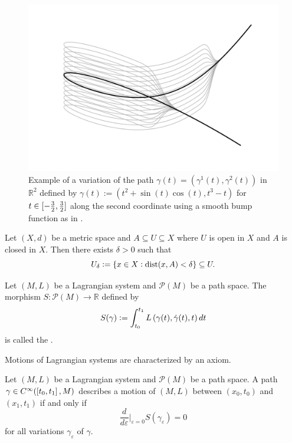 \begin{example}
	\begin{figure}[h!tb]
		\centering
		\includegraphics[width = .83\textwidth]{variation.pdf}
		\caption{Example of a variation of the path $\gamma(t) = (\gamma^1(t),\gamma^2(t))$ in $\mathbb{R}^2$ defined by $\gamma(t) := (t^2 + \sin(t)\cos(t),t^3 - t)$ for $t \in \intcc[0]{-\frac{3}{2},\frac{3}{2}}$ along the second coordinate using a smooth bump function as in \cite[42]{lee:smooth_manifolds:2013}.}
		\label{fig:variation}
	\end{figure}
\end{example}

\begin{exercise}
	\label{ex:U_delta_neighbourhood}
	Let $(X,d)$ be a metric space and $A \subseteq U \subseteq X$ where $U$ is open in $X$ and $A$ is closed in $X$. Then there exists $\delta > 0$ such that
	\begin{equation*}
		U_\delta := \cbr[0]{x \in X : \dist(x,A) < \delta} \subseteq U.
	\end{equation*}
\end{exercise}

\begin{definition}
	Let $(M,L)$ be a Lagrangian system and $\mathcal{P}(M)$ be a path space. The morphism $S : \mathcal{P}(M) \to \mathbb{R}$ defined by
	\begin{equation*}
		S(\gamma) := \int_{t_0}^{t_1} L\del[0]{\gamma(t),\dot{\gamma}(t),t} dt
	\end{equation*}
	\noindent is called the .
\end{definition}

Motions of Lagrangian systems are characterized by an axiom.

\begin{axiom}
	\label{ax:Hamilton_least_action}
	Let $(M,L)$ be a Lagrangian system and $\mathcal{P}(M)$ be a path space. A path $\gamma \in C^\infty(\intcc[0]{t_0,t_1},M)$ describes a motion of $(M,L)$ between $(x_0,t_0)$ and $(x_1,t_1)$ if and only if 
	\begin{equation}
		\frac{d}{d\varepsilon}\bigg\vert_{\varepsilon = 0} S(\gamma_\varepsilon) = 0
	\end{equation}
	\noindent for all variations $\gamma_\varepsilon$ of $\gamma$.
\end{axiom}

